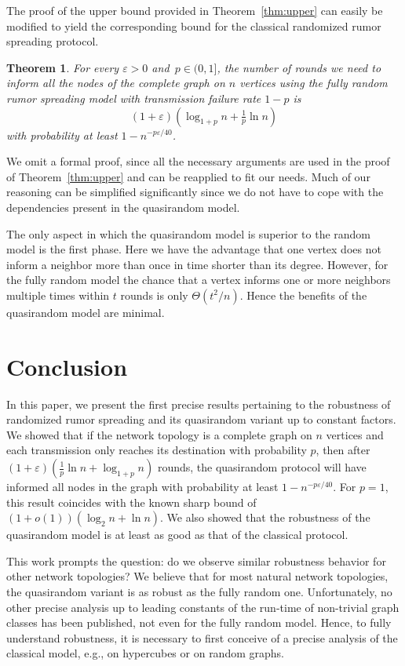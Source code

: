 \documentclass[12pt]{article}
\newtheorem{theorem}{Theorem}
\newcommand{\e}{\varepsilon}
\begin{document}
{The proof of the upper bound provided in Theorem~\ref{thm:upper} can easily be modified to yield the corresponding bound for the classical randomized rumor spreading protocol.

\begin{theorem}\label{thm:upperrandom}
For every $\e>0$ and~$p \in (0,1]$, the number of rounds we need to inform all the nodes of the complete graph on $n$ vertices using the fully random rumor spreading model with transmission failure rate $1-p$ is
\begin{equation*}
 (1+\e)\left(\log_{1+p}n+\tfrac{1}{p}\ln n\right)
\end{equation*} 
with probability at least $1-n^{-p\e/40}$.
\end{theorem}

We omit a formal proof, since all the necessary arguments are used in the proof of Theorem~\ref{thm:upper} and can be reapplied to fit our needs. Much of our reasoning can be simplified significantly since we do not have to cope with the dependencies present in the quasirandom model. 

The only aspect in which the quasirandom model is superior to the random model is the first phase. Here we have the advantage that one vertex does not inform a neighbor more than once in time shorter than its degree. However, for the fully random model the chance that a vertex informs one or more neighbors multiple times within $t$ rounds is only $\Theta(t^2/n)$. Hence the benefits of the quasirandom model are minimal.


\section{Conclusion}

In this paper, we present the first precise results pertaining to the robustness of randomized rumor spreading and its quasirandom variant up to constant factors. We showed that if the network topology is a complete graph on $n$ vertices and each transmission only reaches its destination with probability $p$, then after $(1+\e)\left(\frac{1}{p}\ln n+\log_{1+p} n\right)$ rounds, the quasirandom protocol will have informed all nodes in the graph with probability at least $1-n^{-p\e/40}$. For $p = 1$, this result coincides with the known sharp bound of $(1 + o(1)) (\log_2 n + \ln n)$. We also showed that the robustness of the quasirandom model is at least as good as that of the classical protocol. 

This work prompts the question: do we observe similar robustness behavior for other network topologies? We believe that for most natural network topologies, the quasirandom variant is as robust as the fully random one. Unfortunately, no other precise analysis up to leading constants of the run-time of non-trivial graph classes has been published, not even for the fully random model. Hence, to fully understand robustness, it is necessary to first conceive of a precise analysis of the classical model, e.g., on hypercubes or on random graphs.
}



\end{document}
